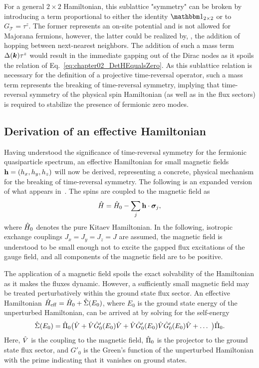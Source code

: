 For a general $2\times2$ Hamiltonian, this sublattice "symmetry" can be broken by introducing a term proportional to either the identity $\id_{2\times2}$ or to $G_\mathcal{T} = \tau^z$.
The former represents an on-site potential and is not allowed for Majorana fermions, however, the latter could be realized by, \eg, the addition of hopping between next-nearest neighbors.
The addition of such a mass term $\Delta(\bm{k}) \tau^z$ would result in the immediate gapping out of the Dirac nodes as it spoils the relation of Eq.~\eqref{eq:chapter02_DetHEqualsZero}.
As this sublattice relation is necessary for the definition of a projective time-reversal operator, such a mass term represents the breaking of time-reversal symmetry, implying that time-reversal symmetry of the physical spin Hamiltonian (as well as in the flux sectors) is required to stabilize the presence of fermionic zero modes.


%
%
\subsection{Derivation of an effective Hamiltonian}
%
%
Having understood the significance of time-reversal symmetry for the fermionic quasiparticle spectrum, an effective Hamiltonian for small magnetic fields\linebreak ${\bf h} = (h_x, h_y, h_z)$ will now be derived, representing a concrete, physical mechanism for the breaking of time-reversal symmetry.
The following is an expanded version of what appears in~\cite{KitaevAoP2006}.
The spins are coupled to the magnetic field as
%
\begin{equation}
	\hat{H} = \hat{H}_0 - \sum_j {\bf h} \cdot \bm{\sigma}_j,
\end{equation}
%
where $\hat{H}_0$ denotes the pure Kitaev Hamiltonian.
In the following, isotropic exchange couplings $J_x = J_y = J_z = J$ are assumed, the magnetic field is understood to be small enough not to excite the gapped flux excitations of the gauge field, and all components of the magnetic field are to be positive.

The application of a magnetic field spoils the exact solvability of the Hamiltonian as it makes the fluxes dynamic.
However, a sufficiently small magnetic field may be treated perturbatively within the ground state flux sector.
An effective Hamiltonian $\hat{H}_{\rm eff} = \hat{H}_0 + \hat{\Sigma}(E_0)$, where $E_0$ is the ground state energy of the unperturbed Hamiltonian, can be arrived at by solving for the self-energy
%
\begin{equation}
\hat{\Sigma}(E_0) = \hat{\Pi}_0 \big(\hat{V} + \hat{V} \hat{G}'_0(E_0) \hat{V} + \hat{V} \hat{G}'_0(E_0) \hat{V} \hat{G}'_0(E_0) \hat{V} + \ldots~\big) \hat{\Pi}_0.
\end{equation}
%
Here, $\hat{V}$ is the coupling to the magnetic field, $\hat{\Pi}_0$ is the projector to the ground state flux sector, and $G'_0$ is the Green's function of the unperturbed Hamiltonian with the prime indicating that it vanishes on ground states.

